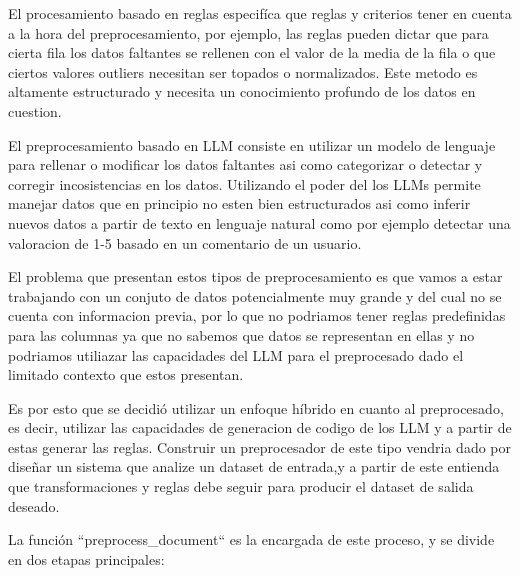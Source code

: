 El procesamiento basado en reglas especifíca que reglas y criterios tener en cuenta a la hora del preprocesamiento, por ejemplo, las reglas pueden dictar que para cierta fila los datos faltantes se rellenen con el valor de la media de la fila o que ciertos valores outliers necesitan ser topados o normalizados. Este metodo es altamente estructurado y necesita un conocimiento profundo de los datos en cuestion.

El preprocesamiento basado en LLM consiste en utilizar un modelo de lenguaje para rellenar o modificar los datos faltantes asi como categorizar o detectar y corregir incosistencias en los datos. Utilizando el poder del los LLMs permite manejar datos que en principio no esten bien estructurados asi como inferir nuevos datos a partir de texto en lenguaje natural como por ejemplo detectar una valoracion de 1-5 basado en un comentario de un usuario.

El problema que presentan estos tipos de preprocesamiento es que vamos a estar trabajando con un conjuto de datos potencialmente muy grande y del cual no se cuenta con informacion previa, por lo que no podriamos tener reglas predefinidas para las columnas ya que no sabemos que datos se representan en ellas y no podriamos utiliazar las capacidades del LLM para el preprocesado dado el limitado contexto que estos presentan.

Es por esto que se decidió utilizar un enfoque híbrido en cuanto al preprocesado, es decir, utilizar las capacidades de generacion de codigo de los LLM y a partir de estas generar las reglas. Construir un preprocesador de este tipo vendria dado por diseñar un sistema que analize un dataset de entrada,y a partir de este entienda que transformaciones y reglas debe seguir para producir el dataset de salida deseado.

La función ``preprocess\_document`` es la encargada de este proceso, y se divide en dos etapas principales:

